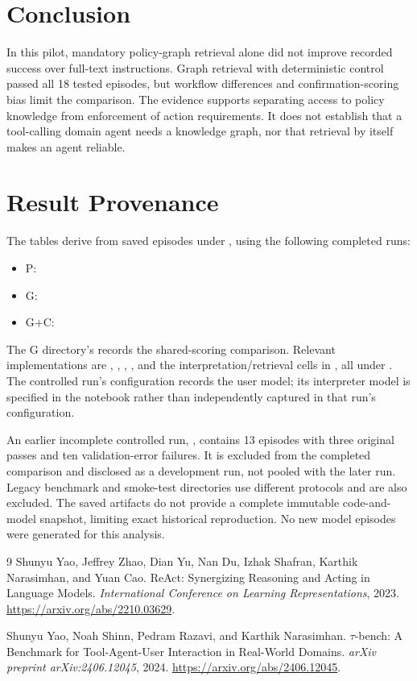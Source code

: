 \documentclass[11pt]{article}
\begin{document}
\section{Conclusion}
In this pilot, mandatory policy-graph retrieval alone did not improve recorded success over full-text instructions. Graph retrieval with deterministic control passed all 18 tested episodes, but workflow differences and confirmation-scoring bias limit the comparison. The evidence supports separating access to policy knowledge from enforcement of action requirements. It does not establish that a tool-calling domain agent needs a knowledge graph, nor that retrieval by itself makes an agent reliable.

\appendix
\section{Result Provenance}
The tables derive from saved episodes under , using the following completed runs:
\begin{itemize}
\item P: 
\item G: 
\item G+C: 
\end{itemize}
The G directory's  records the shared-scoring comparison. Relevant implementations are , , , , and the interpretation/retrieval cells in , all under . The controlled run's configuration records the user model; its interpreter model is specified in the notebook rather than independently captured in that run's configuration.

An earlier incomplete controlled run, , contains 13 episodes with three original passes and ten validation-error failures. It is excluded from the completed comparison and disclosed as a development run, not pooled with the later run. Legacy benchmark and smoke-test directories use different protocols and are also excluded. The saved artifacts do not provide a complete immutable code-and-model snapshot, limiting exact historical reproduction. No new model episodes were generated for this analysis.

\begin{thebibliography}{9}
Shunyu Yao, Jeffrey Zhao, Dian Yu, Nan Du, Izhak Shafran, Karthik Narasimhan, and Yuan Cao.
ReAct: Synergizing Reasoning and Acting in Language Models.
\emph{International Conference on Learning Representations}, 2023.
\url{https://arxiv.org/abs/2210.03629}.

Shunyu Yao, Noah Shinn, Pedram Razavi, and Karthik Narasimhan.
$\tau$-bench: A Benchmark for Tool-Agent-User Interaction in Real-World Domains.
\emph{arXiv preprint arXiv:2406.12045}, 2024.
\url{https://arxiv.org/abs/2406.12045}.
\end{thebibliography}
\end{document}
